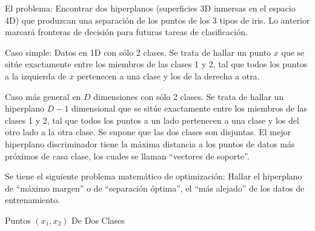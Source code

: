 \documentclass[10pd,hyperref={colorlinks=true}]{beamer}
\begin{document}

 \begin{frame}{}

 \vfill
 \centerline{}

 \centerline{}
 \vfill

 \end{frame}


 \begin{frame}{}

 El problema: Encontrar dos hiperplanos (superficies 3D inmersas en el 
espacio 4D) que produzcan una separaci\'on de los puntos de los 3 tipos 
de iris. Lo anterior marcar\'a fronteras de decisi\'on para futuras 
tareas de clasificaci\'on.

 Caso simple: Datos en 1D con s\'olo 2 clases. Se trata de hallar un 
punto $x$ que se sit\'ue exactamente entre los miembros de las clases 1 
y 2, tal que todos los puntos a la izquierda de $x$ pertenecen a una 
clase y los de la derecha a otra.

 Caso m\'as general en $D$ dimensiones con s\'olo 2 clases. Se trata de 
hallar un hiperplano $D-1$ dimensional que se sit\'ue exactamente entre 
los miembros de las clases 1 y 2, tal que todos los puntos a un lado 
pertenecen a una clase y los del otro lado a la otra clase. Se supone 
que las dos clases son disjuntas. El mejor hiperplano discriminador 
tiene la m\'axima distancia a los puntos de datos m\'as pr\'oximos de 
casa clase, los cuales se llaman ``vectores de soporte''.

 Se tiene el siguiente problema matem\'atico de optimizaci\'on: Hallar 
el hiperplano de ``m\'aximo margen'' o de ``separaci\'on \'optima'', el 
``m\'as alejado'' de los datos de entrenamiento.

 \end{frame}


 \begin{frame}{Puntos $(x_1,x_2)$ De Dos Clases}

 \vfill
 \centerline{}
 \centerline{}
 \vfill

 \end{frame}

\end{document}
